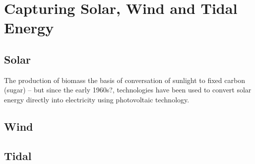 \chapter{Capturing Solar, Wind and Tidal Energy}\label{ch:tidalsolarwind}

\section{Solar}

The production of biomass the basis of conversation of sunlight to fixed carbon (sugar) -- but since the early 1960s?, technologies have been used to convert solar energy directly into electricity using photovoltaic technology. 

\section{Wind}

\section{Tidal}



